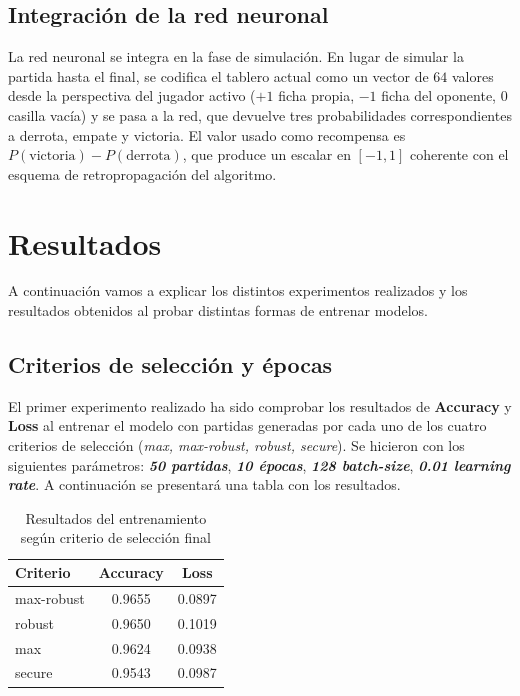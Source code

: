 \documentclass[conference,a4paper]{IEEEtran}
\begin{document}
\subsection{Integración de la red neuronal}

La red neuronal se integra en la fase de simulación. En lugar de simular la
partida hasta el final, se codifica el tablero actual como un vector de $64$
valores desde la perspectiva del jugador activo ($+1$ ficha propia, $-1$ ficha
del oponente, $0$ casilla vacía) y se pasa a la red, que devuelve tres
probabilidades correspondientes a derrota, empate y victoria. El valor usado
como recompensa es $P(\text{victoria}) - P(\text{derrota})$, que produce un
escalar en $[-1, 1]$ coherente con el esquema de retropropagación del algoritmo.

\section{Resultados}\label{sec:Resultados}
A continuación vamos a explicar los distintos experimentos realizados y los resultados obtenidos al probar distintas formas de entrenar modelos.

\subsection{Criterios de selección y épocas}

El primer experimento realizado ha sido comprobar los resultados de \textbf{Accuracy} y \textbf{Loss} al entrenar el modelo con partidas generadas por cada uno de los cuatro criterios de selección (\textit{max, max-robust, robust, secure}). Se hicieron con los siguientes parámetros: \textbf{\textit{50 partidas}}, \textbf{\textit{10 épocas}}, \textbf{\textit{128 batch-size}}, \textbf{\textit{0.01 learning rate}}. A continuación se presentará una tabla con los resultados.

\begin{table}[h]
\centering
\caption{Resultados del entrenamiento según criterio de selección final}
\label{tab:criterios}
\begin{tabular}{lcc}
\hline
\textbf{Criterio} & \textbf{Accuracy} & \textbf{Loss} \\
\hline
max-robust & 0.9655 & 0.0897 \\
robust     & 0.9650 & 0.1019 \\
max        & 0.9624 & 0.0938 \\
secure     & 0.9543 & 0.0987 \\
\hline
\end{tabular}
\end{table}
\end{document}
